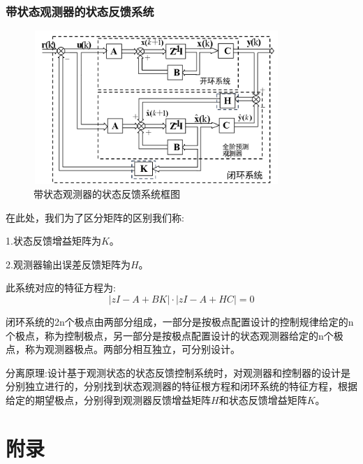 \documentclass[12pt, a4paper, oneside]{ctexbook}
\begin{document}
\subsection{带状态观测器的状态反馈系统}
\begin{figure}[htbp]
	\centering
	\includegraphics[width=9.3cm,height=5.8cm]{img/9_5.png}
	\caption{带状态观测器的状态反馈系统框图}
\end{figure}

\noindent 在此处，我们为了区分矩阵的区别我们称:

\noindent 1.状态反馈增益矩阵为$K$。

\noindent 2.观测器输出误差反馈矩阵为$H$。

此系统对应的特征方程为:
$$
|zI-A+BK|\cdot|zI-A+HC|=0
$$

闭环系统的2n个极点由两部分组成，一部分是按极点配置设计的控制规律给定的n个极点，称为控制极点，另一部分是按极点配置设计的状态观测器给定的n个极点，称为观测器极点。两部分相互独立，可分别设计。

分离原理:设计基于观测状态的状态反馈控制系统时，对观测器和控制器的设计是分别独立进行的，分别找到状态观测器的特征根方程和闭环系统的特征方程，根据给定的期望极点，分别得到观测器反馈增益矩阵$H$和状态反馈增益矩阵$K$。
\newpage
\chapter{附录}
\end{document}
